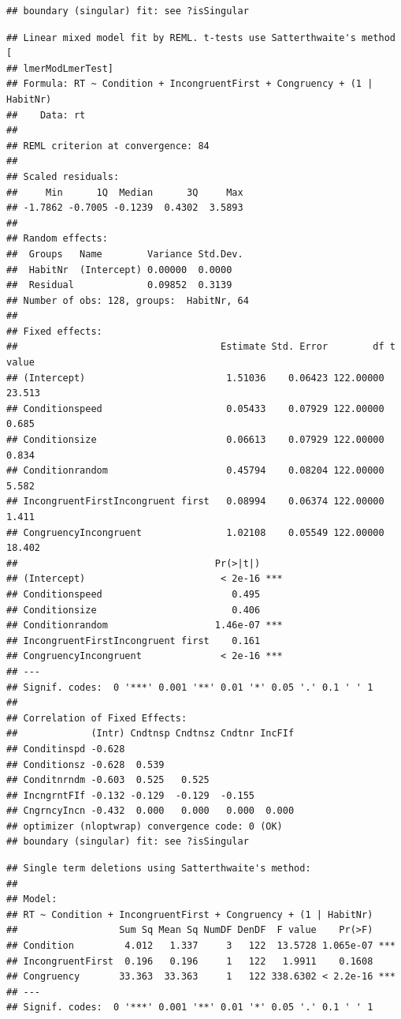\documentclass[
]{book}
\begin{document}
\begin{verbatim}
## boundary (singular) fit: see ?isSingular
\end{verbatim}

\begin{verbatim}
## Linear mixed model fit by REML. t-tests use Satterthwaite's method [
## lmerModLmerTest]
## Formula: RT ~ Condition + IncongruentFirst + Congruency + (1 | HabitNr)
##    Data: rt
## 
## REML criterion at convergence: 84
## 
## Scaled residuals: 
##     Min      1Q  Median      3Q     Max 
## -1.7862 -0.7005 -0.1239  0.4302  3.5893 
## 
## Random effects:
##  Groups   Name        Variance Std.Dev.
##  HabitNr  (Intercept) 0.00000  0.0000  
##  Residual             0.09852  0.3139  
## Number of obs: 128, groups:  HabitNr, 64
## 
## Fixed effects:
##                                    Estimate Std. Error        df t value
## (Intercept)                         1.51036    0.06423 122.00000  23.513
## Conditionspeed                      0.05433    0.07929 122.00000   0.685
## Conditionsize                       0.06613    0.07929 122.00000   0.834
## Conditionrandom                     0.45794    0.08204 122.00000   5.582
## IncongruentFirstIncongruent first   0.08994    0.06374 122.00000   1.411
## CongruencyIncongruent               1.02108    0.05549 122.00000  18.402
##                                   Pr(>|t|)    
## (Intercept)                        < 2e-16 ***
## Conditionspeed                       0.495    
## Conditionsize                        0.406    
## Conditionrandom                   1.46e-07 ***
## IncongruentFirstIncongruent first    0.161    
## CongruencyIncongruent              < 2e-16 ***
## ---
## Signif. codes:  0 '***' 0.001 '**' 0.01 '*' 0.05 '.' 0.1 ' ' 1
## 
## Correlation of Fixed Effects:
##             (Intr) Cndtnsp Cndtnsz Cndtnr IncFIf
## Conditinspd -0.628                              
## Conditionsz -0.628  0.539                       
## Conditnrndm -0.603  0.525   0.525               
## IncngrntFIf -0.132 -0.129  -0.129  -0.155       
## CngrncyIncn -0.432  0.000   0.000   0.000  0.000
## optimizer (nloptwrap) convergence code: 0 (OK)
## boundary (singular) fit: see ?isSingular
\end{verbatim}

\begin{verbatim}
## Single term deletions using Satterthwaite's method:
## 
## Model:
## RT ~ Condition + IncongruentFirst + Congruency + (1 | HabitNr)
##                  Sum Sq Mean Sq NumDF DenDF  F value    Pr(>F)    
## Condition         4.012   1.337     3   122  13.5728 1.065e-07 ***
## IncongruentFirst  0.196   0.196     1   122   1.9911    0.1608    
## Congruency       33.363  33.363     1   122 338.6302 < 2.2e-16 ***
## ---
## Signif. codes:  0 '***' 0.001 '**' 0.01 '*' 0.05 '.' 0.1 ' ' 1
\end{verbatim}
\end{document}
